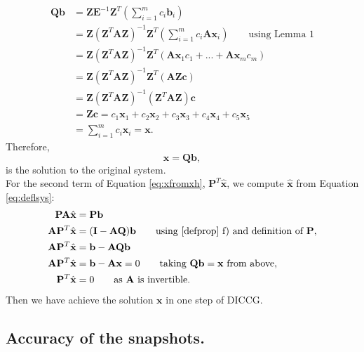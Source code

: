 \documentclass[12pt]{article}
\numberwithin{equation}{section}
\begin{document}
\begin{align*}
\mathbf{Q}\mathbf{b}&=\mathbf{Z}\mathbf{E}^{-1}\mathbf{Z}^T\left(\sum_{i=1}^m {c}_i\mathbf{b}_i\right)\\
&=\mathbf{Z}(\mathbf{Z}^T\mathbf{A}\mathbf{Z})^{-1}\mathbf{Z}^T\left(\sum_{i=1}^m {c}_i\mathbf{A}\mathbf{x}_i\right)\qquad \text{using Lemma 1}\\
&=\mathbf{Z}(\mathbf{Z}^T\mathbf{A}\mathbf{Z})^{-1}\mathbf{Z}^T\left( \mathbf{A}\mathbf{x}_1{c}_1+...+\mathbf{A}\mathbf{x}_m{c}_m\right) \\
&=\mathbf{Z}(\mathbf{Z}^T\mathbf{A}\mathbf{Z})^{-1}\mathbf{Z}^T(\mathbf{A}\mathbf{Z}\mathbf{c})  \\
&=\mathbf{Z}(\mathbf{Z}^T\mathbf{A}\mathbf{Z})^{-1}(\mathbf{Z}^T\mathbf{A}\mathbf{Z})\mathbf{c} \\
&=\mathbf{Z}\mathbf{c}= c_1\mathbf{x}_1+c_2\mathbf{x}_2+c_3\mathbf{x}_3+c_4\mathbf{x}_4+c_5\mathbf{x}_5\\
& =\sum_{i=1}^m {c}_i\mathbf{x}_i=\mathbf{x}.
\end{align*}
Therefore,
\begin{equation}\label{eq:xqb}
\mathbf{x}=\mathbf{Q}\mathbf{b},
\end{equation}
is the solution to the original system.\\ 
For the second term of Equation \eqref{eq:xfromxh}, $\mathbf{P}^T\mathbf{\hat{x}}$, we compute $\mathbf{\hat{x}}$ from Equation \eqref{eq:deflsys}:
\begin{align*}
    \mathbf{P}\mathbf{A}\hat{\mathbf{x}}&=\mathbf{P}\mathbf{b}\\
    \mathbf{A}\mathbf{P}^T\hat{\mathbf{x}}&=(\mathbf{I}-\mathbf{A}\mathbf{Q})\mathbf{b} \qquad \text{using \ref{defprop} f) and definition of $\mathbf{P}$,}\\
        \mathbf{A}\mathbf{P}^T\hat{\mathbf{x}}&=\mathbf{b}-\mathbf{A}\mathbf{Q}\mathbf{b}\\
        \mathbf{A}\mathbf{P}^T\hat{\mathbf{x}}&=\mathbf{b}-\mathbf{A}\mathbf{x}=0 \qquad \text{taking $\mathbf{Q}\mathbf{b}=\mathbf{x}$ from above,}\\
          \mathbf{P}^T\hat{\mathbf{x}}&=0 \qquad \text{as $\mathbf{A}$ is invertible.}
\end{align*}
Then we have achieve the solution $\mathbf{x}$ in one step of DICCG.\\

\subsection{Accuracy of the snapshots.}\label{accs}
\end{document}
